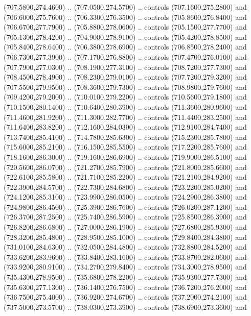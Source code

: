 {\begin{scope}[y=0.80pt, x=0.80pt, yscale=-1, xscale=1, inner sep=0pt, outer sep=0pt, #1]
      (707.5800,274.4600) .. (707.0500,274.5700) .. controls (707.1600,275.2800) and
      (706.6000,275.7600) .. (706.3300,276.3500) .. controls (705.8600,276.8400) and
      (706.6700,277.7900) .. (705.8800,278.0600) .. controls (705.1500,277.7700) and
      (705.1300,278.4200) .. (704.9000,278.9100) .. controls (705.4200,278.8500) and
      (705.8400,278.6400) .. (706.3800,278.6900) .. controls (706.8500,278.2400) and
      (706.7300,277.3900) .. (707.1700,276.8800) .. controls (707.4700,276.0100) and
      (707.7900,277.0300) .. (708.1900,277.3100) .. controls (708.7200,277.7300) and
      (708.4500,278.4900) .. (708.2300,279.0100) .. controls (707.7200,279.3200) and
      (707.5500,279.9500) .. (708.3600,279.7300) .. controls (708.9800,279.7600) and
      (709.4200,279.2000) .. (710.0100,279.2200) .. controls (710.5600,279.1800) and
      (710.1500,280.1400) .. (710.6400,280.3900) .. controls (711.3600,280.9600) and
      (711.4600,281.9200) .. (711.3000,282.7700) .. controls (711.4400,283.2500) and
      (711.6400,283.8200) .. (712.1600,284.0300) .. controls (712.9100,284.7400) and
      (713.7400,285.4100) .. (714.7800,285.6300) .. controls (715.2300,285.7800) and
      (715.6000,285.2100) .. (716.1500,285.5500) .. controls (717.2200,285.7600) and
      (718.1600,286.3000) .. (719.1600,286.6900) .. controls (719.9000,286.5100) and
      (720.5600,286.0700) .. (721.2700,285.7900) .. controls (721.8000,285.6600) and
      (722.6100,285.5800) .. (721.7100,285.2200) .. controls (721.2100,284.9200) and
      (722.3900,284.5700) .. (722.7300,284.6800) .. controls (723.2200,285.0200) and
      (724.1200,285.3100) .. (723.9900,286.0500) .. controls (724.2900,286.3800) and
      (724.9800,286.4500) .. (725.3900,286.7600) .. controls (726.0200,287.1200) and
      (726.3700,287.2500) .. (725.7400,286.5900) .. controls (725.8500,286.3900) and
      (726.8200,286.6800) .. (727.0000,286.1900) .. controls (727.6800,285.9300) and
      (728.3200,285.4800) .. (728.9500,285.1000) .. controls (729.8400,284.3800) and
      (731.0100,284.6300) .. (732.0500,284.4800) .. controls (732.8800,284.5200) and
      (733.6200,283.9600) .. (733.8400,283.1600) .. controls (733.8700,282.0600) and
      (733.9200,280.9100) .. (734.2700,279.8400) .. controls (734.3000,278.9500) and
      (735.4300,278.9500) .. (735.6800,278.2200) .. controls (735.9300,277.7300) and
      (735.6300,277.1300) .. (736.1400,276.7500) .. controls (736.7200,276.2000) and
      (736.7500,275.4000) .. (736.9200,274.6700) .. controls (737.2000,274.2100) and
      (737.5000,273.5700) .. (738.0300,273.3900) .. controls (738.6900,273.3600) and

\end{scope}}
